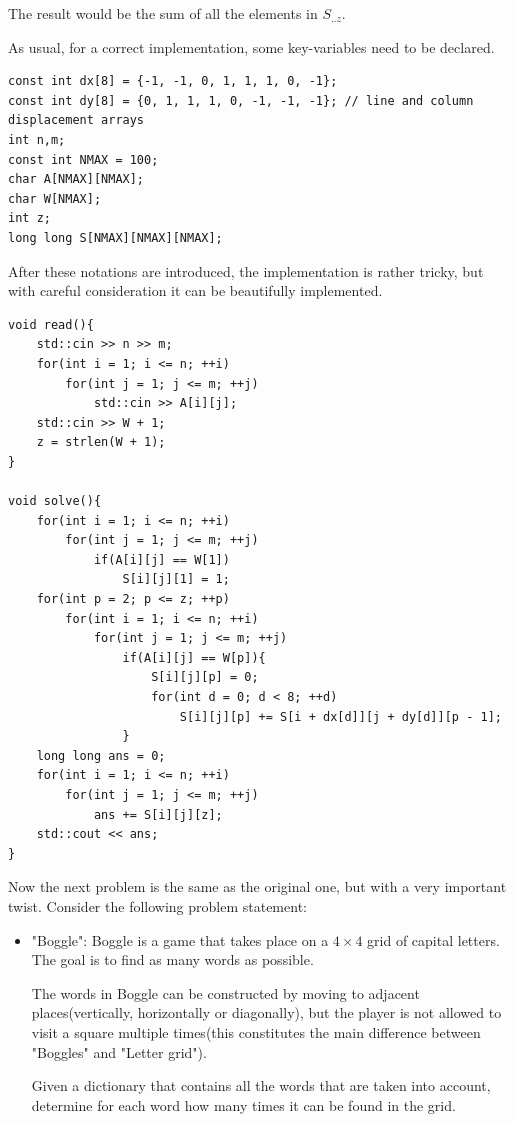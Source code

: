 \documentclass[letterpaper]{article}
\begin{document}
The result would be the sum of all the elements in $S_{..z}$.

As usual, for a correct implementation, some key-variables need to be declared.

\newpage

\begin{lstlisting}
const int dx[8] = {-1, -1, 0, 1, 1, 1, 0, -1};
const int dy[8] = {0, 1, 1, 1, 0, -1, -1, -1}; // line and column displacement arrays
int n,m;
const int NMAX = 100;
char A[NMAX][NMAX];
char W[NMAX];
int z;
long long S[NMAX][NMAX][NMAX];
\end{lstlisting}

After these notations are introduced, the implementation is rather tricky, but with careful consideration it can be beautifully implemented.

\begin{lstlisting}
void read(){
    std::cin >> n >> m;
    for(int i = 1; i <= n; ++i)
        for(int j = 1; j <= m; ++j)
            std::cin >> A[i][j];
    std::cin >> W + 1;
    z = strlen(W + 1);
}

void solve(){
    for(int i = 1; i <= n; ++i)
        for(int j = 1; j <= m; ++j)
            if(A[i][j] == W[1])
                S[i][j][1] = 1;
    for(int p = 2; p <= z; ++p)
        for(int i = 1; i <= n; ++i)
            for(int j = 1; j <= m; ++j)
                if(A[i][j] == W[p]){
                    S[i][j][p] = 0;
                    for(int d = 0; d < 8; ++d)
                        S[i][j][p] += S[i + dx[d]][j + dy[d]][p - 1];
                }
    long long ans = 0;
    for(int i = 1; i <= n; ++i)
        for(int j = 1; j <= m; ++j)
            ans += S[i][j][z];
    std::cout << ans;
}
\end{lstlisting}

Now the next problem is the same as the original one, but with a very important twist. Consider the following problem statement:

\begin{itemize}
    \item "Boggle": Boggle is a game that takes place on a $4 \times 4$ grid of capital letters. The goal is to find as many words as possible.

    The words in Boggle can be constructed by moving to adjacent places(vertically, horizontally or diagonally), but the player is not allowed to visit a square multiple times(this constitutes the main difference between "Boggles" and "Letter grid").

    Given a dictionary that contains all the words that are taken into account, determine for each word how many times it can be found in the grid.
\end{itemize}
\end{document}
